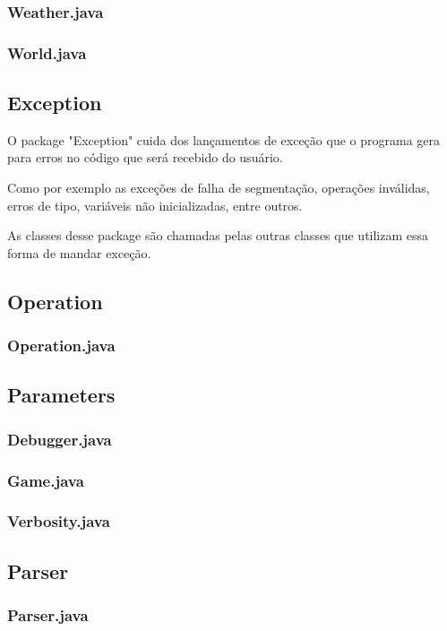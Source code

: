 \documentclass[a4paper]{article}
\begin{document}
		\subsubsection{ Weather.java }						
		\subsubsection{ World.java }				
				
	\subsection{Exception}
		O package "Exception" cuida dos lançamentos de exceção
		que o programa gera para erros no código que será recebido
		do usuário.

		Como por exemplo as exceções de falha de segmentação,
		operações inválidas, erros de tipo, variáveis não
		inicializadas, entre outros.
		
		As classes desse package são chamadas pelas outras classes
		que utilizam essa forma de mandar exceção.
		 
	\subsection{Operation}
		\subsubsection{ Operation.java }
		
	\subsection{Parameters}
		\subsubsection{ Debugger.java }
		\subsubsection{ Game.java     }
		\subsubsection{ Verbosity.java}
		
	\subsection{Parser}
		\subsubsection{ Parser.java }
		
\end{document}

